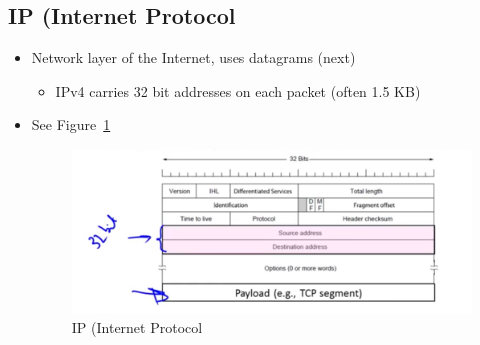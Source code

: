 \documentclass[12pt]{ctexart}   %
\begin{document}
	\subsection{IP (Internet Protocol}
	\begin{itemize}
		\item Network layer of the Internet, uses datagrams (next)
		\begin{itemize}
			\item IPv4 carries 32 bit addresses on each packet (often 1.5 KB)
		\end{itemize}
		\item See Figure~\ref{fig:4-2-5}
		
		\begin{figure}[h!] %
		\centering
		 \includegraphics[scale=0.7]{images/4-2-5}
		\caption{ IP (Internet Protocol }
		 \label{fig:4-2-5}
		 \end{figure}
	\end{itemize}
	
\end{document}
